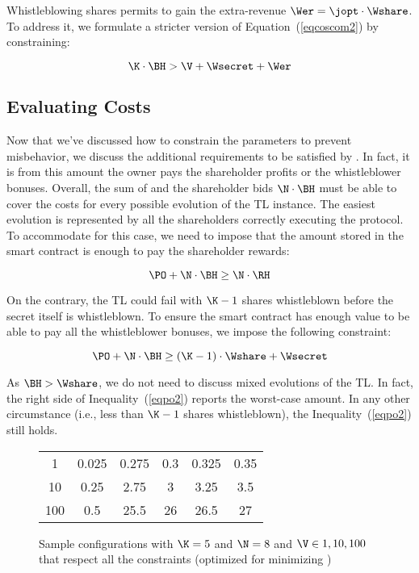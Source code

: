 Whistleblowing shares permits to gain the extra-revenue $ \Wer = \jopt \cdot \Wshare$.
%
To address it, we formulate a stricter version of Equation~(\ref{eqcoscom2}) by constraining:

\begin{equation}\label{eqcoscom2w}
\K \cdot \BH > \V + \Wsecret + \Wer
\end{equation}


\subsection{Evaluating Costs}\label{sect:economic_po}

Now that we've discussed how to constrain the parameters to prevent misbehavior, we discuss the additional requirements to be satisfied by \PO.
In fact, it is from this amount the owner pays the shareholder profits or the whistleblower bonuses. 
Overall, the sum of \PO and the shareholder bids $\N \cdot \BH$ must be able to cover the costs for every possible evolution of the TL instance.
The easiest evolution is represented by all the shareholders correctly executing the protocol. To accommodate for this case, we need to impose that the amount stored in the smart contract is enough to pay the shareholder rewards:

\begin{equation}\label{eqpo1}
\PO + \N \cdot \BH \geq \N \cdot \RH
\end{equation}

On the contrary, the TL could fail with $\K-1$ shares whistleblown before the secret itself is whistleblown.
To ensure the smart contract has enough value to be able to pay all the whistleblower bonuses, we impose the following constraint:

\begin{equation}\label{eqpo2}
\PO + \N \cdot \BH \geq (\K-1) \cdot \Wshare + \Wsecret
\end{equation}

As $\BH > \Wshare$, we do not need to discuss mixed evolutions of the TL. In fact, the right side of Inequality~(\ref{eqpo2}) reports the worst-case amount.
In any other circumstance (i.e., less than $\K-1$ shares whistleblown), 
the Inequality~(\ref{eqpo2}) still holds.

\begin{figure}[t]
	\centering
	\begin{tabular}[b]{| c | c | c | c | c | c |}	
		\hline
		\V & \Wshare & \BH & \RH & \Wsecret & \PO \\
		\hline \hline
		1 & 0.025 &  0.275 &  0.3 &  0.325 &  0.35 \\
   		\hline \hline
		10 & 0.25  &  2.75  &  3   &  3.25  &  3.5  \\
   		\hline \hline
		100 & 0.5   & 25.5   & 26   & 26.5   & 27    \\
		\hline
	\end{tabular}
	\caption{Sample configurations with $\K=5$ and $\N=8$ and $\V \in {1,10,100}$ that respect all the constraints (optimized for minimizing \PO)}
	\label{table:variables}	
\end{figure} 

